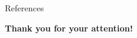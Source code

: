 \documentclass[aspectratio=169,xcolor=dvipsnames]{beamer}
\begin{document}

\begin{frame}{References}
    \footnotesize
    \nocite{*}
    
    
\end{frame}


\begin{frame}
    \Huge{\centerline{\textbf{Thank you for your attention!  }}}
\end{frame}

\end{document}

